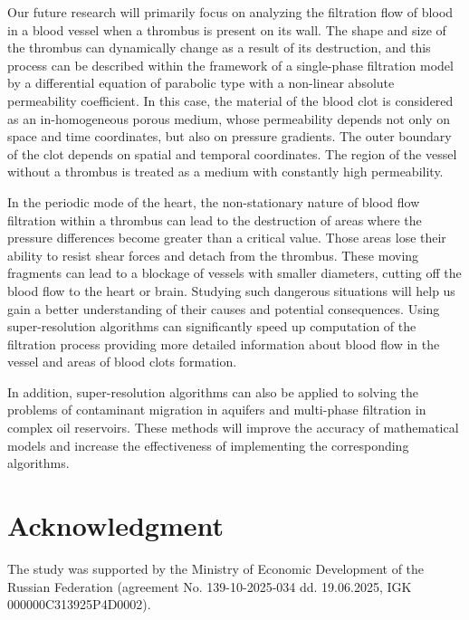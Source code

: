 \documentclass{ieeeaccess}
\begin{document}
Our future research will primarily focus on analyzing the filtration flow of blood in a blood vessel when a thrombus is present on its wall. The shape and size of the thrombus can dynamically change as a result of its destruction, and this process can be described within the framework of a single-phase filtration model by a differential equation of parabolic type with a non-linear absolute permeability coefficient. In this case, the material of the blood clot is considered as an in-homogeneous porous medium, whose permeability depends not only on space and time coordinates, but also on pressure gradients. The outer boundary of the clot depends on spatial and temporal coordinates. The region of the vessel without a thrombus is treated as a medium with constantly high permeability. 

In the periodic mode of the heart, the non-stationary nature of blood flow filtration within a thrombus can lead to the destruction of areas where the pressure differences become greater than a critical value. Those areas lose their ability to resist shear forces and detach from the thrombus. These moving fragments can lead to a blockage of vessels with smaller diameters, cutting off the blood flow to the heart or brain.  Studying such dangerous situations will help us gain a better understanding of their causes and potential consequences. Using super-resolution algorithms can significantly speed up computation of the filtration process providing more detailed information about blood flow in the vessel and areas of blood clots formation.

In addition, super-resolution algorithms can also be applied to solving the problems of contaminant migration in aquifers and multi-phase filtration in complex oil reservoirs. These methods will improve the accuracy of mathematical models and increase the effectiveness of implementing the corresponding algorithms.


\section*{Acknowledgment}
The study was supported by the Ministry of Economic Development of the Russian Federation (agreement No. 139-10-2025-034 dd. 19.06.2025, IGK 000000C313925P4D0002).

\end{document}
